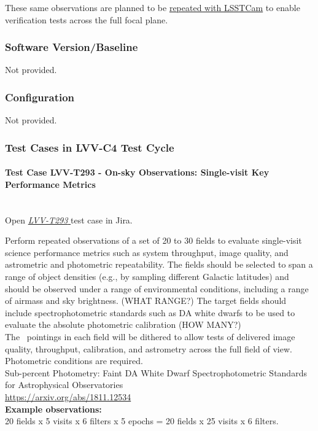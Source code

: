 \documentclass[DM,lsstdraft,STR,toc]{lsstdoc}
\begin{document}
These same observations are planned to be
\href{https://jira.lsstcorp.org/secure/Tests.jspa\#/testCycle/LVV-C6}{repeated
with LSSTCam} to enable verification tests across the full focal plane.


  \subsubsection{Software Version/Baseline}
    Not provided.

  \subsubsection{Configuration}
    Not provided.

  \subsubsection{Test Cases in LVV-C4 Test Cycle}


    \paragraph{Test Case LVV-T293 - On-sky Observations: Single-visit Key Performance Metrics
 }\mbox{}\\

Open  \href{https://jira.lsstcorp.org/secure/Tests.jspa#/testCase/LVV-T293}{\textit{ LVV-T293 } }
test case in Jira.

    Perform repeated observations of a set of 20 to 30 fields to evaluate
single-visit science performance metrics such as system throughput,
image quality, and astrometric and photometric repeatability. The fields
should be selected to span a range of object densities (e.g., by
sampling different Galactic latitudes) and should be observed under a
range of environmental conditions, including a range of airmass and sky
brightness. (WHAT RANGE?) The target fields should include
spectrophotometric standards such as DA white dwarfs to be used to
evaluate the absolute photometric calibration (HOW
MANY?)\\[2\baselineskip]The ~pointings in each field will be dithered to
allow tests of delivered image quality, throughput, calibration, and
astrometry across the full field of view. Photometric conditions are
required.\\[2\baselineskip]Sub-percent Photometry: Faint DA White Dwarf
Spectrophotometric Standards for Astrophysical Observatories\\
\url{https://arxiv.org/abs/1811.12534}\\[2\baselineskip]\textbf{Example
observations:}\\
20 fields x 5 visits x 6 filters x 5 epochs = 20 fields x 25 visits x 6
filters.
\end{document}
